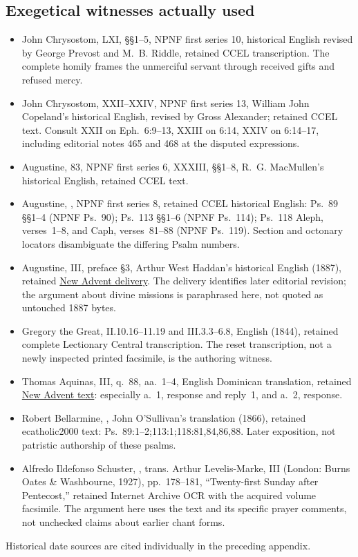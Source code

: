 \subsection{Exegetical witnesses actually used}
\begin{itemize}
\item John Chrysostom,  LXI, \S\S1--5,
NPNF first series 10, historical English revised by George Prevost
and M.~B. Riddle, retained CCEL transcription. The complete homily
frames the unmerciful servant through received gifts and refused mercy.
\item John Chrysostom,  XXII--XXIV,
NPNF first series 13, William John Copeland's historical English,
revised by Gross Alexander; retained CCEL text. Consult XXII on
Eph.~6:9--13, XXIII on 6:14, XXIV on 6:14--17, including editorial
notes 465 and 468 at the disputed expressions.
\item Augustine,  83, NPNF first series 6,
 XXXIII, \S\S1--8,
R.~G. MacMullen's historical English, retained CCEL text.
\item Augustine, , NPNF first series 8,
retained CCEL historical English: Ps.~89 \S\S1--4 (NPNF Ps.~90);
Ps.~113 \S\S1--6 (NPNF Ps.~114); Ps.~118 Aleph, verses~1--8,
and Caph, verses~81--88 (NPNF Ps.~119). Section and octonary
locators disambiguate the differing Psalm numbers.
\item Augustine,  III, preface \S3, Arthur West
Haddan's historical English (1887), retained
\href{https://www.newadvent.org/fathers/130103.htm}{New Advent delivery}.
The delivery identifies later editorial revision; the argument about
divine missions is paraphrased here, not quoted as untouched 1887 bytes.
\item Gregory the Great,  II.10.16--11.19 and
III.3.3--6.8,  English (1844), retained
complete Lectionary Central transcription. The reset transcription,
not a newly inspected printed facsimile, is the authoring witness.
\item Thomas Aquinas,  III, q.~88, aa.~1--4,
English Dominican translation, retained
\href{https://www.newadvent.org/summa/4088.htm}{New Advent text}:
especially a.~1, response and reply~1, and a.~2, response.
\item Robert Bellarmine, ,
John O'Sullivan's translation (1866), retained ecatholic2000 text:
Ps.~89:1--2;113:1;118:81,84,86,88. Later exposition, not patristic
authorship of these psalms.
\item Alfredo Ildefonso Schuster, , trans.
Arthur Levelis-Marke, III (London: Burns Oates \& Washbourne, 1927),
pp.~178--181, ``Twenty-first Sunday after Pentecost,'' retained
Internet Archive OCR with the acquired volume facsimile. The argument
here uses the text and its specific prayer comments, not unchecked
claims about earlier chant forms.
\end{itemize}

Historical date sources are cited individually in the preceding appendix.
